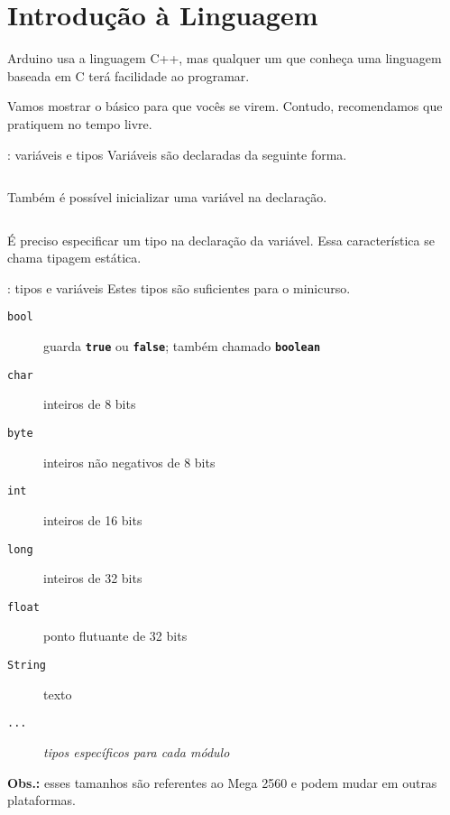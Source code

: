 \section{Introdução à Linguagem}


\begin{frame}{\insertsection}
  Arduino usa a linguagem C++, mas qualquer um que conheça uma linguagem baseada em C terá facilidade ao programar. \medskip

  Vamos mostrar o básico para que vocês se virem. Contudo, recomendamos que pratiquem no tempo livre.
\end{frame}


\begin{frame}{\insertsection: variáveis e tipos}
  Variáveis são declaradas da seguinte forma.
  \inputminted[firstline=1,lastline=1]{arduino}{\SketchPath{introLinguagem}}
  Também é possível inicializar uma variável na declaração.
  \inputminted[firstline=2,lastline=2]{arduino}{\SketchPath{introLinguagem}}

  É preciso especificar um tipo na declaração da variável. Essa característica se chama tipagem estática.

\end{frame}


\begin{frame}{\insertsection: tipos e variáveis}
  Estes tipos são suficientes para o minicurso.

  \begin{description}
    \item[\texttt{bool}] guarda \textbf{\texttt{true}} ou \textbf{\texttt{false}}; também chamado \textbf{\texttt{\textcolor{CustomOrange}{boolean}}}
    \item[\texttt{char}] inteiros de 8 bits
    \item[\texttt{byte}] inteiros não negativos de 8 bits
    \item[\texttt{int}] inteiros de 16 bits
    \item[\texttt{long}] inteiros de 32 bits
    \item[\texttt{float}] ponto flutuante de 32 bits
    \item[\texttt{String}] texto
    \item[\texttt{...}] \textit{tipos específicos para cada módulo}
  \end{description}

  \vfill
  \textbf{Obs.:} esses tamanhos são referentes ao Mega 2560 e podem mudar em outras plataformas.
\end{frame}


